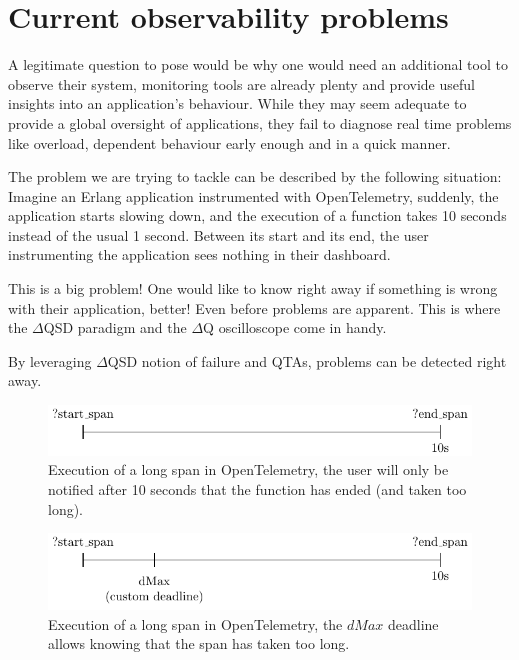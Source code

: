 \section{Current observability problems}

    A legitimate question to pose would be why one would need an additional tool to observe their system, monitoring tools are already plenty and provide useful insights into an application's behaviour. While they may seem adequate to provide a global oversight of applications, they fail to diagnose real time problems like overload, dependent behaviour early enough and in a quick manner.

    The problem we are trying to tackle can be described by the following situation: 
    Imagine an Erlang application instrumented with OpenTelemetry, suddenly, the application starts slowing down, and the execution of a function takes 10 seconds instead of the usual 1 second. Between its start and its end, the user instrumenting the application sees nothing in their dashboard.
    
    This is a big problem! One would like to know right away if something is wrong with their application, better! Even before problems are apparent. This is where the $\Delta$QSD paradigm and the $\Delta$Q oscilloscope come in handy.
   
   By leveraging $\Delta$QSD notion of failure and QTAs, problems can be detected right away. 
    
    \begin{figure}[H]
        \begin{center}
            \includegraphics{tikz/start_end.pdf}
        \end{center}
        \caption{Execution of a long span in OpenTelemetry, the user will only be notified after 10 seconds that the function has ended (and taken too long).}
    \end{figure}

    \begin{figure}[H]
        \begin{center}
            \includegraphics{tikz/start_end_dmax.pdf}
        \end{center}
        \caption{Execution of a long span in OpenTelemetry, the $dMax$ deadline allows knowing that the span has taken too long.}
        \label{fig:otel_dmax}
    \end{figure} 


